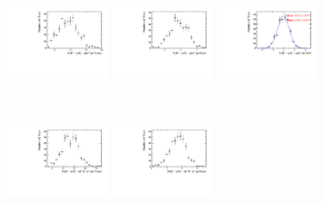 \begin{figure}[!h]
   \centering
   \begin{subfigure}[t]{1.0\textwidth}
      \includegraphics[width=0.32\textwidth]{figs/B2DsPhi/Plots_DsKK_Value_yield_peak_total_DsPhi_Ds2PhiPi_toy_both_DsBDTbin1_PhiBDTbin1_both_both.pdf}
      \includegraphics[width=0.32\textwidth]{figs/B2DsPhi/Plots_DsKK_Error_yield_peak_total_DsPhi_Ds2PhiPi_toy_both_DsBDTbin1_PhiBDTbin1_both_both.pdf}
      \includegraphics[width=0.32\textwidth]{figs/B2DsPhi/Plots_DsKK_Pull_yield_peak_total_DsPhi_Ds2PhiPi_toy_both_DsBDTbin1_PhiBDTbin1_both_both.pdf}
      \caption{\decay{\Dsp}{\phiz\pip}}
   \end{subfigure}\\
   \begin{subfigure}[t]{1.0\textwidth}
      \includegraphics[width=0.32\textwidth]{figs/B2DsPhi/Plots_DsKK_Value_yield_peak_total_DsPhi_Ds2KKPi_toy_both_DsBDTbin1_PhiBDTbin1_both_both.pdf}
      \includegraphics[width=0.32\textwidth]{figs/B2DsPhi/Plots_DsKK_Error_yield_peak_total_DsPhi_Ds2KKPi_toy_both_DsBDTbin1_PhiBDTbin1_both_both.pdf}

\end{subfigure}
\end{figure}
